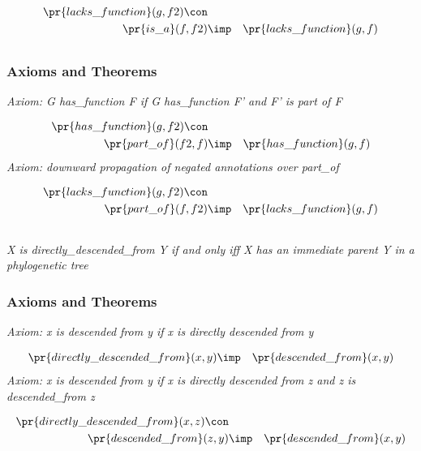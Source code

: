 \begin{eqnarray*}
 \pr{lacks\_function}(g, f2) \con \\
 \pr{is\_a}(f, f2) &\imp & \pr{lacks\_function}(g, f) 
\end{eqnarray*}
\subsection*{ }
\subsubsection*{Axioms and Theorems}

\emph{Axiom: G has\_function F if G has\_function F' and F' is part of F}

\begin{eqnarray*}
 \pr{has\_function}(g, f2) \con \\
 \pr{part\_of}(f2, f) &\imp & \pr{has\_function}(g, f) 
\end{eqnarray*}
\emph{Axiom: downward propagation of negated annotations over part\_of}

\begin{eqnarray*}
 \pr{lacks\_function}(g, f2) \con \\
 \pr{part\_of}(f, f2) &\imp & \pr{lacks\_function}(g, f) 
\end{eqnarray*}
\subsection*{ }
\emph{X is directly\_descended\_from Y if and only iff X has an immediate parent Y in a phylogenetic tree}

\subsubsection*{Axioms and Theorems}

\emph{Axiom: x is descended from y if x is directly descended from y}

\begin{eqnarray*}
 \pr{directly\_descended\_from}(x, y) &\imp & \pr{descended\_from}(x, y) 
\end{eqnarray*}
\emph{Axiom: x is descended from y if x is directly descended from z and z is descended\_from z}

\begin{eqnarray*}
 \pr{directly\_descended\_from}(x, z) \con \\
 \pr{descended\_from}(z, y) &\imp & \pr{descended\_from}(x, y) 
\end{eqnarray*}
